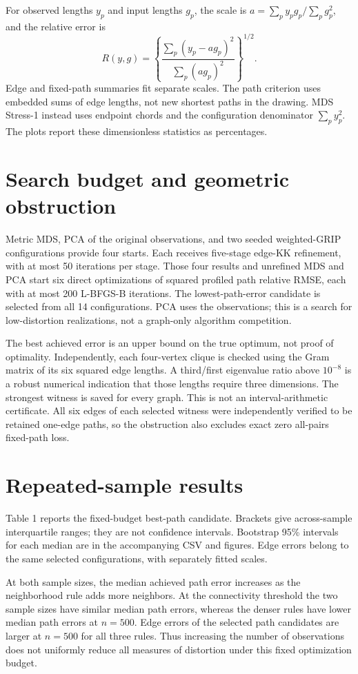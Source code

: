 \documentclass[10pt]{article}
\begin{document}
For observed lengths $y_p$ and input lengths $g_p$, the scale is
$a=\sum_p y_pg_p/\sum_p g_p^2$, and the relative error is
\[
 R(y,g)=\left\{\frac{\sum_p(y_p-a g_p)^2}{\sum_p(a g_p)^2}\right\}^{1/2}.
\]
Edge and fixed-path summaries fit separate scales. The path criterion uses
embedded sums of edge lengths, not new shortest paths in the drawing. MDS
Stress-1 instead uses endpoint chords and the configuration denominator
$\sum_p y_p^2$. The plots report these dimensionless statistics as percentages.

\section*{Search budget and geometric obstruction}
Metric MDS, PCA of the original observations, and two seeded weighted-GRIP
configurations provide four starts. Each receives five-stage edge-KK refinement,
with at most 50 iterations per stage. Those four results and unrefined MDS and
PCA start six direct optimizations of squared profiled path relative RMSE, each
with at most 200 L-BFGS-B iterations. The lowest-path-error candidate is selected
from all 14 configurations. PCA uses the observations; this is a search for
low-distortion realizations, not a graph-only algorithm competition.

The best achieved error is an upper bound on the true optimum, not proof of
optimality. Independently, each four-vertex clique is checked using the Gram
matrix of its six squared edge lengths. A third/first eigenvalue ratio above
$10^{-8}$ is a robust numerical indication that those lengths require three
dimensions. The strongest witness is saved for every graph. This is not an
interval-arithmetic certificate. All six edges of each selected witness were
independently verified to be retained one-edge paths, so the obstruction also
excludes exact zero all-pairs fixed-path loss.

\section*{Repeated-sample results}
Table 1 reports the fixed-budget best-path candidate. Brackets give across-sample
interquartile ranges; they are not confidence intervals. Bootstrap 95\% intervals
for each median are in the accompanying CSV and figures. Edge errors belong to
the same selected configurations, with separately fitted scales.



At both sample sizes, the median achieved path error increases as the neighborhood
rule adds more neighbors. At the connectivity threshold the two sample sizes
have similar median path errors, whereas the denser rules have lower median path
errors at $n=500$. Edge errors of the selected path candidates are larger at
$n=500$ for all three rules. Thus increasing the number of observations does not
uniformly reduce all measures of distortion under this fixed optimization budget.
\end{document}
